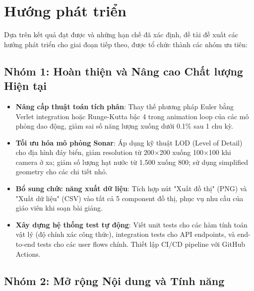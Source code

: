 \section{Hướng phát triển}

Dựa trên kết quả đạt được và những hạn chế đã xác định, đề tài đề xuất các hướng phát triển cho giai đoạn tiếp theo, được tổ chức thành các nhóm ưu tiên:

\subsection{Nhóm 1: Hoàn thiện và Nâng cao Chất lượng Hiện tại}

\begin{itemize}
    \item \textbf{Nâng cấp thuật toán tích phân}: Thay thế phương pháp Euler bằng Verlet integration hoặc Runge-Kutta bậc 4 trong animation loop của các mô phỏng dao động, giảm sai số năng lượng xuống dưới 0.1\% sau 1 chu kỳ.
    
    \item \textbf{Tối ưu hóa mô phỏng Sonar}: Áp dụng kỹ thuật LOD (Level of Detail) cho địa hình đáy biển, giảm resolution từ 200×200 xuống 100×100 khi camera ở xa; giảm số lượng hạt nước từ 1.500 xuống 800; sử dụng simplified geometry cho các chi tiết nhỏ.
    
    \item \textbf{Bổ sung chức năng xuất dữ liệu}: Tích hợp nút "Xuất đồ thị" (PNG) và "Xuất dữ liệu" (CSV) vào tất cả 5 component đồ thị, phục vụ nhu cầu của giáo viên khi soạn bài giảng.
    
    \item \textbf{Xây dựng hệ thống test tự động}: Viết unit tests cho các hàm tính toán vật lý (độ chính xác công thức), integration tests cho API endpoints, và end-to-end tests cho các user flows chính. Thiết lập CI/CD pipeline với GitHub Actions.
\end{itemize}

\subsection{Nhóm 2: Mở rộng Nội dung và Tính năng}

